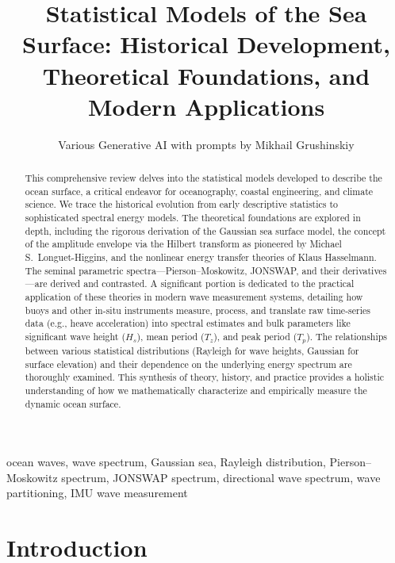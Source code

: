 \documentclass[journal,10pt,twocolumn]{IEEEtran}
\title{Statistical Models of the Sea Surface: Historical Development, Theoretical Foundations, and Modern Applications}
\author{Various Generative AI with prompts by Mikhail Grushinskiy}
\begin{document}
    \maketitle

    \begin{abstract}
        This comprehensive review delves into the statistical models developed to describe the ocean surface, a critical endeavor for oceanography, coastal engineering, and climate science. We trace the historical evolution from early descriptive statistics to sophisticated spectral energy models. The theoretical foundations are explored in depth, including the rigorous derivation of the Gaussian sea surface model, the concept of the amplitude envelope via the Hilbert transform as pioneered by Michael S.~Longuet-Higgins, and the nonlinear energy transfer theories of Klaus Hasselmann. The seminal parametric spectra---Pierson--Moskowitz, JONSWAP, and their derivatives---are derived and contrasted. A significant portion is dedicated to the practical application of these theories in modern wave measurement systems, detailing how buoys and other in-situ instruments measure, process, and translate raw time-series data (e.g., heave acceleration) into spectral estimates and bulk parameters like significant wave height ($H_s$), mean period ($T_z$), and peak period ($T_p$). The relationships between various statistical distributions (Rayleigh for wave heights, Gaussian for surface elevation) and their dependence on the underlying energy spectrum are thoroughly examined. This synthesis of theory, history, and practice provides a holistic understanding of how we mathematically characterize and empirically measure the dynamic ocean surface.
    \end{abstract}

    \begin{IEEEkeywords}
        ocean waves, wave spectrum, Gaussian sea, Rayleigh distribution, Pierson--Moskowitz spectrum, JONSWAP spectrum, directional wave spectrum, wave partitioning, IMU wave measurement
    \end{IEEEkeywords}

    \section{Introduction}
\end{document}
